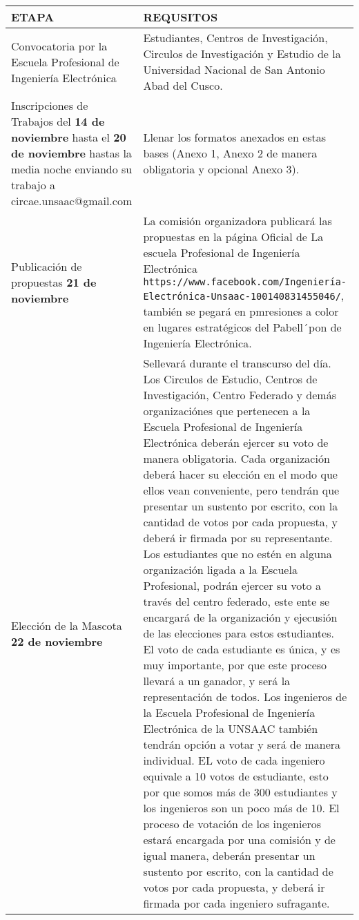 \documentclass{article}
\begin{document}
\begin{tabular}{|p{8cm}|p{8cm}|}
\hline
\textbf{ETAPA} &  \textbf{REQUSITOS} \\ \hline
Convocatoria por la Escuela Profesional de Ingeniería Electrónica 
& Estudiantes, Centros de Investigación, Circulos de Investigación y Estudio de la Universidad Nacional de San Antonio Abad del Cusco. \\ \hline

Inscripciones de Trabajos del \textbf{14 de noviembre} hasta el \textbf{20 de noviembre} hastas la media noche enviando su trabajo a circae.unsaac@gmail.com & 
Llenar los formatos anexados en estas bases (Anexo 1, Anexo 2 de manera obligatoria y opcional Anexo 3). \\ \hline

Publicación de propuestas \textbf{21 de noviembre} 
& La comisión organizadora publicará las propuestas en la página Oficial de La escuela Profesional de Ingeniería Electrónica \texttt{https://www.facebook.com/Ingeniería-Electrónica-Unsaac-100140831455046/}, también se pegará en pmresiones a color en lugares estratégicos del Pabell´pon de Ingeniería Electrónica. \\ \hline

Elección de la Mascota \textbf{22 de noviembre}& 
Sellevará durante el transcurso del día. Los Circulos de Estudio, Centros de Investigación, Centro Federado y demás organizaciónes que pertenecen a la Escuela Profesional de Ingeniería Electrónica deberán ejercer su voto de manera obligatoria. Cada organización deberá hacer su elección en el modo que ellos vean conveniente, pero tendrán que presentar un sustento por escrito, con la cantidad de votos por cada propuesta, y deberá ir firmada por su representante. Los estudiantes que no estén en alguna organización ligada a la Escuela Profesional, podrán ejercer su voto a través del centro federado, este ente se encargará de la organización y ejecusión de las elecciones para estos estudiantes. El voto de cada estudiante es única, y es muy importante, por que este proceso llevará a un ganador, y será la representación de todos. Los ingenieros de la Escuela Profesional de Ingeniería Electrónica de la UNSAAC también tendrán opción a votar y será de manera individual. EL voto de cada ingeniero equivale a 10 votos de estudiante, esto por que somos más de 300 estudiantes y los ingenieros son un poco más de 10. El proceso de votación de los ingenieros estará encargada por una comisión y de igual manera, deberán presentar un sustento por escrito, con la cantidad de votos por cada propuesta, y deberá ir firmada por cada ingeniero sufragante.\\ \hline


\end{tabular}
\end{document}
